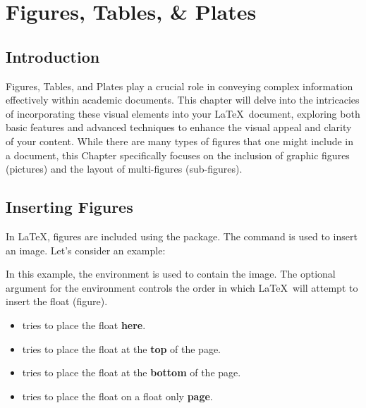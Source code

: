 \chapter{Figures, Tables, \& Plates}\label{ch:figureandtables}

	\section{Introduction}
		Figures, Tables, and Plates play a crucial role in conveying complex information effectively within academic documents. 
		This chapter will delve into the intricacies of incorporating these visual elements into your \LaTeX\ document, exploring both basic features and advanced techniques to enhance the visual appeal and clarity of your content.
		While there are many types of figures that one might include in a document, this Chapter specifically focuses on the inclusion of graphic figures (pictures) and the layout of multi-figures (sub-figures).

	\section{Inserting Figures}
		In \LaTeX, figures are included using the  package. 
		The  command is used to insert an image. 
		Let's consider an example:


		In this example, the  environment is used to contain the image. 
		The optional argument  for the  environment controls the order in which \LaTeX\ will attempt to insert the float (figure).
		\begin{itemize}
			\item {} tries to place the float \textbf{here}.
			\item {} tries to place the float at the \textbf{top} of the page.
			\item {} tries to place the float at the \textbf{bottom} of the page.
			\item {} tries to place the float on a float only \textbf{page}.
		\end{itemize}

